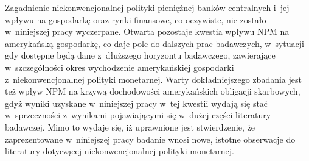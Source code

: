 Zagadnienie niekonwencjonalnej polityki pieniężnej banków centralnych i~jej wpływu na gospodarkę oraz rynki finansowe, co oczywiste, nie zostało w~niniejszej pracy wyczerpane. Otwarta pozostaje kwestia wpływu \acs{NPM} na amerykańską gospodarkę, co daje pole do dalszych prac badawczych, w~sytuacji gdy dostępne będą dane z~dłuższego horyzontu badawczego, zawierające w~szczególności okres wychodzenie amerykańskiej gospodarki z~niekonwencjonalnej polityki monetarnej. Warty dokładniejszego zbadania jest też wpływ \acs{NPM} na krzywą dochodowości amerykańskich obligacji skarbowych, gdyż wyniki uzyskane w~niniejszej pracy w~tej kwestii wydają się stać w~sprzeczności z~wynikami pojawiającymi się w~dużej części literatury badawczej. Mimo to wydaje się, iż uprawnione jest stwierdzenie, że zaprezentowane w~niniejszej pracy badanie wnosi nowe, istotne obserwacje do literatury dotyczącej niekonwencjonalnej polityki monetarnej.